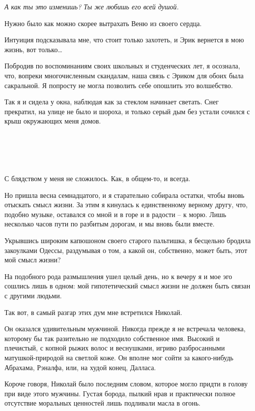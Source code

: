 \documentclass[
]{book}
\begin{document}
\emph{А как ты это изменишь? Ты же любишь его всей душой.}

Нужно было как можно скорее вытрахать Веню из своего сердца.

Интуиция подсказывала мне, что стоит только захотеть, и Эрик вернется в мою жизнь, вот только\ldots{}

Побродив по воспоминаниям своих школьных и студенческих лет, я осознала, что, вопреки многочисленным скандалам, наша связь с Эриком для обоих была сакральной. Я попросту не могла позволить себе опошлить это волшебство.

Так я и сидела у окна, наблюдая как за стеклом начинает светать. Снег прекратил, на улице не было и шороха, и только серый дым без устали сочился с крыш окружающих меня домов.

\hypertarget{chapter-95}{%
\chapter{~}\label{chapter-95}}

С блядством у меня не сложилось. Как, в общем-то, и всегда.

Но пришла весна семнадцатого, и я старательно собирала остатки, чтобы вновь отыскать смысл жизни. За этим я кинулась к единственному верному другу, что, подобно музыке, оставался со мной и в горе и в радости -- к морю. Лишь несколько часов пути по разбитым дорогам, и мы вновь были вместе.

Укрывшись широким капюшоном своего старого пальтишка, я бесцельно бродила закоулками Одессы, раздумывая о том, а какой он, собственно, может быть, этот мой смысл жизни?

На подобного рода размышления ушел целый день, но к вечеру я и мое эго сошлись лишь в одном: мой гипотетический смысл жизни не должен быть связан с другими людьми.

Так вот, в самый разгар этих дум мне встретился Николай.

Он оказался удивительным мужчиной. Никогда прежде я не встречала человека, которому бы так разительно не подходило собственное имя. Высокий и плечистый, с копной рыжих волос и веснушками, игриво разбросанными матушкой-природой на светлой коже. Он вполне мог сойти за какого-нибудь Абрахама, Рэналфа, или, на худой конец, Далласа.

Короче говоря, Николай было последним словом, которое могло придти в голову при виде этого мужчины. Густая борода, пылкий нрав и практически полное отсутствие моральных ценностей лишь подливали масла в огонь.
\end{document}
